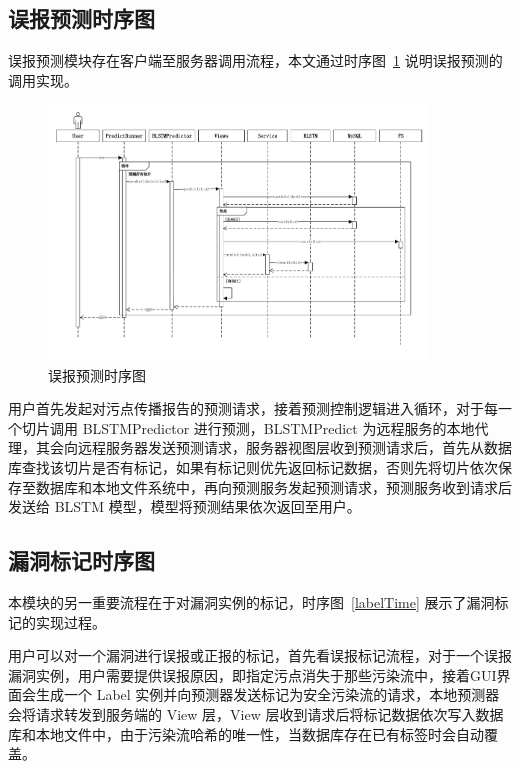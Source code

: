 \subsection{误报预测时序图}
误报预测模块存在客户端至服务器调用流程，本文通过时序图~\ref{predictTime} 说明误报预测的调用实现。

\begin{figure}[!htb]
    \centering
    \includegraphics[width=0.9\textwidth]{FIGs/chapter4/predictTime.pdf}
    \caption{误报预测时序图}\label{predictTime}
\end{figure}

用户首先发起对污点传播报告的预测请求，接着预测控制逻辑进入循环，对于每一个切片调用 BLSTMPredictor 进行预测，BLSTMPredict 为远程服务的本地代理，其会向远程服务器发送预测请求，服务器视图层收到预测请求后，首先从数据库查找该切片是否有标记，如果有标记则优先返回标记数据，否则先将切片依次保存至数据库和本地文件系统中，再向预测服务发起预测请求，预测服务收到请求后发送给 BLSTM 模型，模型将预测结果依次返回至用户。\\

\subsection{漏洞标记时序图}

本模块的另一重要流程在于对漏洞实例的标记，时序图~\ref{labelTime} 展示了漏洞标记的实现过程。

用户可以对一个漏洞进行误报或正报的标记，首先看误报标记流程，对于一个误报漏洞实例，用户需要提供误报原因，即指定污点消失于那些污染流中，接着GUI界面会生成一个 Label 实例并向预测器发送标记为安全污染流的请求，本地预测器会将请求转发到服务端的 View 层，View 层收到请求后将标记数据依次写入数据库和本地文件中，由于污染流哈希的唯一性，当数据库存在已有标签时会自动覆盖。

